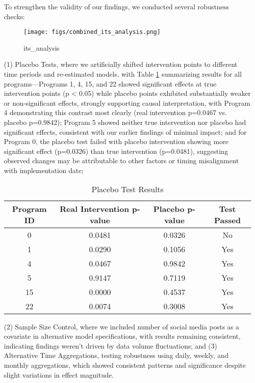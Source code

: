 \documentclass[a4paper,fleqn,12pt]{cas-sc}
\begin{document}
To strengthen the validity of our findings, we conducted several robustness checks: 

\begin{figure}[h]
\centering
\texttt{[image: figs/combined\_its\_analysis.png]}
\caption{its_analysis}
\label{fig:sample_size_analysis}
\end{figure}

(1) Placebo Tests, where we artificially shifted intervention points to different time periods and re-estimated models, with Table \ref{tab:placebo_results} summarizing results for all programs—Programs 1, 4, 15, and 22 showed significant effects at true intervention points (p < 0.05) while placebo points exhibited substantially weaker or non-significant effects, strongly supporting causal interpretation, with Program 4 demonstrating this contrast most clearly (real intervention p=0.0467 vs. placebo p=0.9842); Program 5 showed neither true intervention nor placebo had significant effects, consistent with our earlier findings of minimal impact; and for Program 0, the placebo test failed with placebo intervention showing more significant effect (p=0.0326) than true intervention (p=0.0481), suggesting observed changes may be attributable to other factors or timing misalignment with implementation date; 

    \begin{table}[h]
    \centering
    \caption{Placebo Test Results}
    \label{tab:placebo_results}
    \begin{tabular}{cccc}
    \hline
    Program ID & Real Intervention p-value & Placebo p-value & Test Passed \\
    \hline
    0 & 0.0481 & 0.0326 & No \\
    1 & 0.0290 & 0.1056 & Yes \\
    4 & 0.0467 & 0.9842 & Yes \\
    5 & 0.9147 & 0.7119 & Yes \\
    15 & 0.0000 & 0.4537 & Yes \\
    22 & 0.0074 & 0.3008 & Yes \\
    \hline
    \end{tabular}
    \end{table}

(2) Sample Size Control, where we included number of social media posts as a covariate in alternative model specifications, with results remaining consistent, indicating findings weren't driven by data volume fluctuations; and (3) Alternative Time Aggregations, testing robustness using daily, weekly, and monthly aggregations, which showed consistent patterns and significance despite slight variations in effect magnitude.
\end{document}
